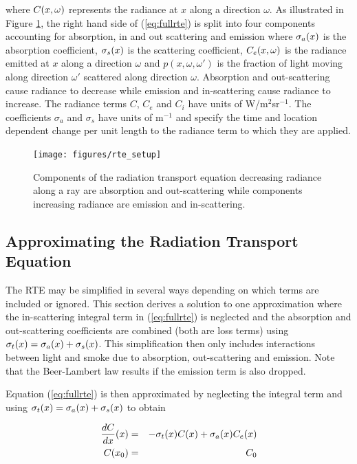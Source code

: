 \noindent where  $C(x,\omega)$ represents the  radiance at $x$ along a direction $\omega$.
As illustrated in Figure \ref{figRadiance}, the right hand side of (\ref{eq:fullrte}) is split into four components accounting for absorption, in and out scattering and emission where $\sigma_a(x)$ is the absorption coefficient, $\sigma_s(x)$ is the scattering coefficient, $C_e(x,\omega)$ is the radiance emitted at $x$ along a direction $\omega$ and $p(x,\omega,\omega')$ is the fraction of light moving along direction $\omega'$ scattered along direction $\omega$. Absorption and out-scattering cause radiance to decrease while emission and in-scattering cause radiance to increase. The radiance terms $C$, $C_e$ and $C_i$ have units of W/m$^2$sr$^{-1}$.  The coefficients $\sigma_a$ and $\sigma_s$ have units of m$^{-1}$ and specify the time and location dependent change per unit length to the radiance term to which they are applied.

\begin{figure}[\figoptions]
\begin{center}
\texttt{[image: figures/rte\_setup]}
\end{center}
\caption{Components of the radiation transport equation decreasing radiance along a ray are
absorption and out-scattering while components increasing radiance are emission and in-scattering.}
\label{figRadiance}
\end{figure}


\subsection{Approximating the Radiation Transport Equation}

The RTE may be simplified in several ways depending on which terms are included or ignored.  This section derives a solution to one approximation where the in-scattering integral term in (\ref{eq:fullrte}) is neglected and the absorption and out-scattering coefficients are combined (both are loss terms) using $\sigma_t(x)=\sigma_a(x)+\sigma_s(x)$.  This simplification then only includes interactions between light and smoke due to absorption,  out-scattering and emission.  Note that the Beer-Lambert law results if the emission term is also dropped.

Equation (\ref{eq:fullrte}) is then approximated by neglecting the integral term and using $\sigma_t(x)=\sigma_a(x)+\sigma_s(x)$ to obtain

\begin{eqnarray*}
\frac{dC}{dx}(x)&=&-\sigma_t(x) C(x) + \sigma_a(x) C_e(x)\\
 C(x_0)&=&C_0
\end{eqnarray*}

